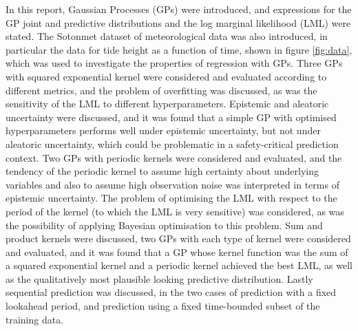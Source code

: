 In this report, Gaussian Processes (GPs) were introduced, and expressions for the GP joint and predictive distributions and the log marginal likelihood (LML) were stated. The Sotonmet dataset of meteorological data was also introduced, in particular the data for tide height as a function of time, shown in figure \ref{fig:data}, which was used to investigate the properties of regression with GPs. Three GPs with squared exponential kernel were considered and evaluated according to different metrics, and the problem of overfitting was discussed, as was the sensitivity of the LML to different hyperparameters. Epistemic and aleatoric uncertainty were discussed, and it was found that a simple GP with optimised hyperparameters performs well under epistemic uncertainty, but not under aleatoric uncertainty, which could be problematic in a safety-critical prediction context. Two GPs with periodic kernels were considered and evaluated, and the tendency of the periodic kernel to assume high certainty about underlying variables and also to assume high observation noise was interpreted in terms of epistemic uncertainty. The problem of optimising the LML with respect to the period of the kernel (to which the LML is very sensitive) was considered, as was the possibility of applying Bayesian optimisation to this problem. Sum and product kernels were discussed, two GPs with each type of kernel were considered and evaluated, and it was found that a GP whose kernel function was the sum of a squared exponential kernel and a periodic kernel achieved the best LML, as well as the qualitatively most plausible looking predictive distribution. Lastly sequential prediction was discussed, in the two cases of prediction with a fixed lookahead period, and prediction using a fixed time-bounded subset of the training data.
